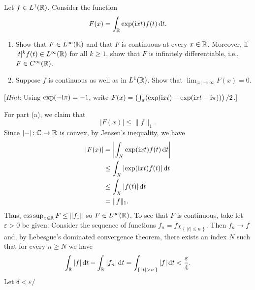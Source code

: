 \begin{problem}
  Let $f\in L^1(\mathbb{R})$. Consider the function
  \[
    F(x)=\int_{\mathbb{R}} \exp(\mathrm{i} xt) f(t)\mathop{}\!\mathrm{d} t.
  \]
  \begin{enumerate}[label=(\roman*),noitemsep]
  \item Show that $F\in L^\infty(\mathbb{R})$ and that $F$ is continuous at every
    $x\in\mathbb{R}$. Moreover, if $|t|^kf(t)\in L^\infty(\mathbb{R})$ for all $k\geq
    1$, show that $F$ is infinitely differentiable, i.e., $F\in
    C^\infty(\mathbb{R})$.
  \item Suppose $f$ is continuous as well as in $L^1(\mathbb{R})$. Show that
    $\lim_{|x|\to\infty} F(x)=0$.
  \end{enumerate}
  [\emph{Hint}: Using $\exp(-\mathrm{i}\pi)=-1$, write
  $F(x)=\left(\int_{\mathbb{R}}(\exp(\mathrm{i} xt)-\exp(\mathrm{i} xt-\mathrm{i}\pi))\right)/2$.]
\end{problem}
\begin{solution}
  For part (a), we claim that
  \[
    |F(x)|\leq\|f\|_1.
  \]
  Since $|{-}|\colon\mathbb{C}\to\mathbb{R}$ is convex, by Jensen's inequality, we
  have
  \begin{align*}
    |F(x)|
    &=\left|\int_X\exp(\mathrm{i} xt)f(t)\mathop{}\!\mathrm{d} t\right|\\
    &\leq\int_X|{\exp(\mathrm{i} xt)f(t)}|\mathop{}\!\mathrm{d} t\\
    &\leq\int_X|f(t)|\mathop{}\!\mathrm{d} t\\
    &=\|f\|_1.
  \end{align*}
  Thus, $\operatorname*{ess\,sup}_{x\in\mathbb{R}}F\leq\|f_1\|$ so $F\in L^\infty(\mathbb{R})$. To see
  that $F$ is continuous, take let $\varepsilon>0$ be given. Consider the
  sequence of functions $f_n=f\chi_{\left\{\,|t|\leq n\,\right\}}$. Then
  $f_n\to f$ and, by Lebesgue's dominated convergence theorem, there exists
  an index $N$ such that for every $n\geq N$ we have
  \[
    \int_\bbR |f|\diff t-\int_\bbR|f_n|\diff t=%
    \int_{\left\{\,|t|>n\,\right\}}|f|\diff t<%
    \frac{\varepsilon}{4}.
  \]
  Let $\delta<\varepsilon/$
\end{solution}

